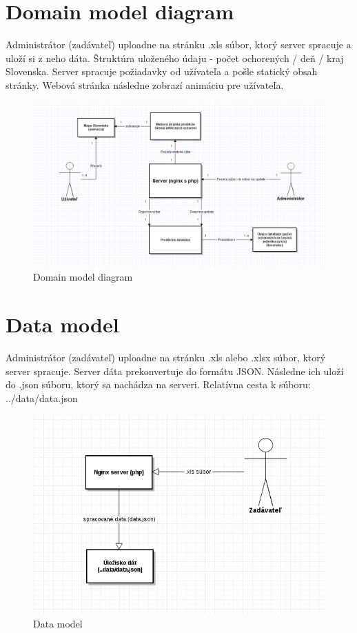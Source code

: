 \documentclass[12pt,a4paper]{report}
\begin{document}
\section[Domain model diagram]{\rmfamily\bfseries
	Domain model diagram}
Administrátor (zadávateľ) uploadne na stránku .xls súbor, ktorý server spracuje a uloží si z neho dáta. Štruktúra uloženého údaju - počet ochorených / deň / kraj Slovenska. Server spracuje požiadavky od užívateľa a pošle statický obsah stránky. Webová stránka následne zobrazí animáciu pre užívateľa.
\begin{figure}[htb]
\includegraphics[scale=0.5]{Domain_model_diagram}
\caption[Domain model diagram]{Domain model diagram}
 \label{fig:Domain model diagram}
\end{figure}

\section[Data model]{\rmfamily\bfseries
	Data model}
Administrátor (zadávateľ) uploadne na stránku .xls alebo .xlsx súbor, ktorý server spracuje. Server dáta prekonvertuje do formátu JSON. Následne ich uloží do .json súboru, ktorý sa nachádza na serveri. Relatívna cesta k súboru: ../data/data.json
\begin{figure}[htb]
	\includegraphics[scale=0.5]{data_model}
	\caption[Data model]{Data model}
	\label{fig:Data model}
\end{figure}
\end{document}

